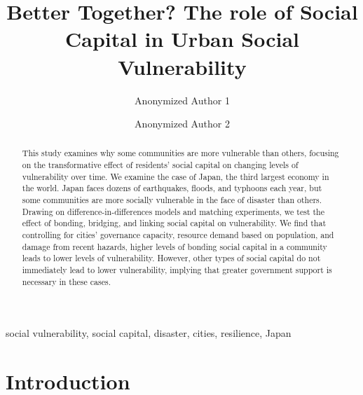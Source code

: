 \documentclass[]{elsarticle} %
\begin{document}
\begin{frontmatter}

  \title{Better Together? The role of Social Capital in Urban Social
Vulnerability}
    \author[]{Anonymized Author 1}
  
    \author[]{Anonymized Author 2}
  
  
  \begin{abstract}
  This study examines why some communities are more vulnerable than
  others, focusing on the transformative effect of residents' social
  capital on changing levels of vulnerability over time. We examine the
  case of Japan, the third largest economy in the world. Japan faces
  dozens of earthquakes, floods, and typhoons each year, but some
  communities are more socially vulnerable in the face of disaster than
  others. Drawing on difference-in-differences models and matching
  experiments, we test the effect of bonding, bridging, and linking
  social capital on vulnerability. We find that controlling for cities'
  governance capacity, resource demand based on population, and damage
  from recent hazards, higher levels of bonding social capital in a
  community leads to lower levels of vulnerability. However, other types
  of social capital do not immediately lead to lower vulnerability,
  implying that greater government support is necessary in these cases.
  \end{abstract}
   \begin{keyword} social vulnerability, social
capital, disaster, cities, resilience, Japan\end{keyword}
 \end{frontmatter}

\captionsetup[table]{labelformat=empty}
\captionsetup[figure]{labelformat=empty}

\hypertarget{introduction}{%
\section{Introduction}\label{introduction}}
\end{document}
